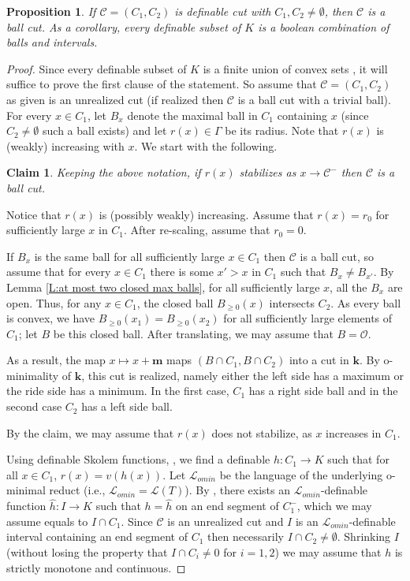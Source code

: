 \documentclass[11pt]{amsart}
\newtheorem{claim}{Claim}[theorem]
\newtheorem{proposition}[theorem]{Proposition}
\theoremstyle{definition}
\newcommand{\m}{\textbf{m}}
\newcommand{\bk}{\textbf{k}}
\newcommand{\CL}{{\mathcal L}}
\newcommand{\CC}{{\mathcal C}}
\newcommand{\CO}{{\mathcal O}}
\newcommand{\0}{\emptyset}
\newenvironment{claimproof}[1][\proofname]
  {%
    \proof[#1]%
      \renewcommand*\qedsymbol{$\square$ (claim)}%
  }
  {%
    \endproof%
  }
\begin{document}
\begin{proposition}\label{ball interval} If $\CC=(C_1,C_2)$ is definable cut with $C_1,C_2 \neq \emptyset$, then $\CC$ is a ball cut. As a corollary, every definable subset of $K$ is a boolean combination of balls and intervals.
\end{proposition}
\begin{proof}
Since every definable subset of $K$ is a finite union of convex sets \cite[Corollary 3.14]{TconvexI}, it will suffice to prove the first clause of the statement. So assume that  $\CC=(C_1,C_2)$ as given is an unrealized cut (if realized then $\CC$  is a ball cut with a trivial ball).  For every $x\in C_1$, let  $B_x$  denote the maximal ball in $C_1$ containing $x$ (since $C_2\neq \emptyset $ such a ball exists) and let $r(x)\in \Gamma$ be its radius. Note that $r(x)$ is (weakly) increasing with $x$. We start with the following.
\begin{claim}\label{C: ball cut}
 Keeping the above notation, if $r(x)$ stabilizes as $x\to \mathcal C^-$ then $\CC$ is a ball cut.
\end{claim}
\begin{claimproof}
    Notice that $r(x)$ is (possibly weakly) increasing.  Assume that $r(x)=r_0$ for sufficiently large $x$ in $C_1$. After re-scaling, assume that $r_0=0$.
    
    If $B_x$ is the same ball for all sufficiently large $x\in C_1$ then $\mathcal C$ is a ball cut, so assume that for every $x\in C_1$ there is some $x'>x$  in $C_1$ such that $B_x\neq B_{x'}$. By Lemma \ref{L:at most two closed max balls}, for all sufficiently large $x$, all the $B_x$ are open. Thus, for any $x\in C_1$, the closed ball $B_{\geq 0}(x)$ intersects $C_2$. As every ball is convex, we have $B_{\geq 0}(x_1)=B_{\geq 0}(x_2)$ for all sufficiently large elements of $C_1$; let $B$ be this closed ball. After translating, we may assume that $B=\CO$. 

    As a result, the map $x\mapsto x+\m$ maps $(B\cap C_1, B\cap C_2)$ into a cut in $\bk$. By o-minimality of $\bk$, this cut is realized, namely either the left side has a maximum or the ride side has a minimum. In the first case, $C_1$ has a right side ball and in the second case $C_2$ has a left side ball.
\end{claimproof}

By the claim, we may assume that $r(x)$ does not stabilize, as $x$ increases in $C_1$. 

Using definable Skolem functions, \cite[Remark 2.7]{vdDries-Tconvex}, we find a definable $h:C_1\to K$ such that for all $x\in C_1$, $r(x)=v(h(x))$. Let $\CL_{omin}$ be the language of the underlying o-minimal reduct (i.e., $\CL_{omin}=\CL(T)$). By \cite[Corollary 2.8]{vdDries-Tconvex}, there exists an $\CL_{omin}$-definable %
function $\widehat h:I\to K$ such that $h=\hat h$ on an end segment of $C_1^-$, which we may assume equals to $I\cap C_1$.  Since $\mathcal C$ is an unrealized cut and $I$ is an $\CL_{omin}$-definable interval containing an end segment of $C_1$ then necessarily $I\cap C_2\neq \0$. Shrinking $I$ (without losing the property that $I\cap C_i\neq 0$ for $i=1,2$) we may assume that $h$ is strictly monotone and continuous. 


\end{proof}
\end{document}
